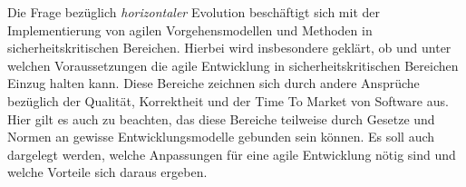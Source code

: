 \documentclass[
	12pt,
	a4paper,
	bibtotocnumbered
	]{scrreprt}
\begin{document}
{Die Frage bezüglich \emph{horizontaler} Evolution beschäftigt sich mit der Implementierung von agilen Vorgehensmodellen und Methoden in sicherheitskritischen Bereichen. 
Hierbei wird insbesondere geklärt, ob und unter welchen Voraussetzungen die agile Entwicklung in sicherheitskritischen Bereichen Einzug halten kann.
Diese Bereiche zeichnen sich durch andere Ansprüche bezüglich der Qualität, Korrektheit und der Time To Market von Software aus.
Hier gilt es auch zu beachten, das diese Bereiche teilweise durch Gesetze und Normen an gewisse Entwicklungsmodelle gebunden sein können.
Es soll auch dargelegt werden, welche Anpassungen für eine agile Entwicklung nötig sind und welche Vorteile sich daraus ergeben.

}

\begin{singlespace}

\setcounter{page}{1}

\end{singlespace}

\tableofcontents
\listoffigures


\cleardoublepage













\printbibliography

\end{document}
